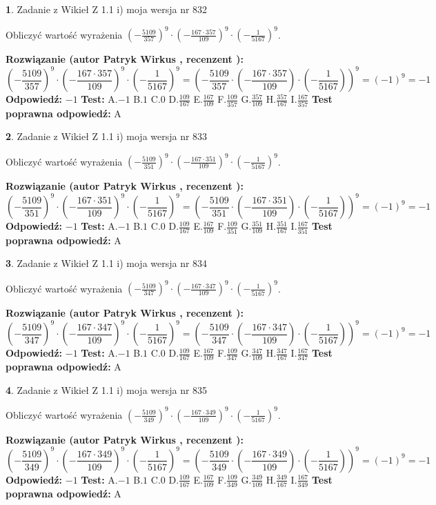 \documentclass[12pt, a4paper]{article}
\theoremstyle{definition} %
\newtheorem{zad}{}
\newcommand{\zadStart}[1]{\begin{zad}#1\newline}
\newcommand{\zadStop}{\end{zad}}
\newcommand{\rozwStart}[2]{\noindent \textbf{Rozwiązanie (autor #1 , recenzent #2): }\newline}
\newcommand{\rozwStop}{\newline}
\newcommand{\odpStart}{\noindent \textbf{Odpowiedź:}\newline}
\newcommand{\odpStop}{\newline}
\newcommand{\testStart}{\noindent \textbf{Test:}\newline}
\newcommand{\testStop}{\newline}
\newcommand{\kluczStart}{\noindent \textbf{Test poprawna odpowiedź:}\newline}
\newcommand{\kluczStop}{\newline}
\begin{document}
\zadStart{Zadanie z Wikieł Z 1.1 i) moja wersja nr 832}

Obliczyć wartość wyrażenia $(-\frac{5109}{357})^{9} \cdot (-\frac{167 \cdot 357}{109})^{9} \cdot (-\frac{1}{5167})^{9}$.
\zadStop
\rozwStart{Patryk Wirkus}{}
$$(-\frac{5109}{357})^{9} \cdot (-\frac{167 \cdot 357}{109})^{9} \cdot (-\frac{1}{5167})^{9} = (-\frac{5109}{357} \cdot (-\frac{167 \cdot 357}{109}) \cdot (-\frac{1}{5167}))^{9} = (-1)^{9} = -1$$
\rozwStop
\odpStart
$-1$
\odpStop
\testStart
A.$-1$ B.$1$ C.$0$ D.$\frac{109}{167}$ E.$\frac{167}{109}$
F.$\frac{109}{357}$ G.$\frac{357}{109}$
H.$\frac{357}{167}$
I.$\frac{167}{357}$
\testStop
\kluczStart
A
\kluczStop



\zadStart{Zadanie z Wikieł Z 1.1 i) moja wersja nr 833}

Obliczyć wartość wyrażenia $(-\frac{5109}{351})^{9} \cdot (-\frac{167 \cdot 351}{109})^{9} \cdot (-\frac{1}{5167})^{9}$.
\zadStop
\rozwStart{Patryk Wirkus}{}
$$(-\frac{5109}{351})^{9} \cdot (-\frac{167 \cdot 351}{109})^{9} \cdot (-\frac{1}{5167})^{9} = (-\frac{5109}{351} \cdot (-\frac{167 \cdot 351}{109}) \cdot (-\frac{1}{5167}))^{9} = (-1)^{9} = -1$$
\rozwStop
\odpStart
$-1$
\odpStop
\testStart
A.$-1$ B.$1$ C.$0$ D.$\frac{109}{167}$ E.$\frac{167}{109}$
F.$\frac{109}{351}$ G.$\frac{351}{109}$
H.$\frac{351}{167}$
I.$\frac{167}{351}$
\testStop
\kluczStart
A
\kluczStop



\zadStart{Zadanie z Wikieł Z 1.1 i) moja wersja nr 834}

Obliczyć wartość wyrażenia $(-\frac{5109}{347})^{9} \cdot (-\frac{167 \cdot 347}{109})^{9} \cdot (-\frac{1}{5167})^{9}$.
\zadStop
\rozwStart{Patryk Wirkus}{}
$$(-\frac{5109}{347})^{9} \cdot (-\frac{167 \cdot 347}{109})^{9} \cdot (-\frac{1}{5167})^{9} = (-\frac{5109}{347} \cdot (-\frac{167 \cdot 347}{109}) \cdot (-\frac{1}{5167}))^{9} = (-1)^{9} = -1$$
\rozwStop
\odpStart
$-1$
\odpStop
\testStart
A.$-1$ B.$1$ C.$0$ D.$\frac{109}{167}$ E.$\frac{167}{109}$
F.$\frac{109}{347}$ G.$\frac{347}{109}$
H.$\frac{347}{167}$
I.$\frac{167}{347}$
\testStop
\kluczStart
A
\kluczStop



\zadStart{Zadanie z Wikieł Z 1.1 i) moja wersja nr 835}

Obliczyć wartość wyrażenia $(-\frac{5109}{349})^{9} \cdot (-\frac{167 \cdot 349}{109})^{9} \cdot (-\frac{1}{5167})^{9}$.
\zadStop
\rozwStart{Patryk Wirkus}{}
$$(-\frac{5109}{349})^{9} \cdot (-\frac{167 \cdot 349}{109})^{9} \cdot (-\frac{1}{5167})^{9} = (-\frac{5109}{349} \cdot (-\frac{167 \cdot 349}{109}) \cdot (-\frac{1}{5167}))^{9} = (-1)^{9} = -1$$
\rozwStop
\odpStart
$-1$
\odpStop
\testStart
A.$-1$ B.$1$ C.$0$ D.$\frac{109}{167}$ E.$\frac{167}{109}$
F.$\frac{109}{349}$ G.$\frac{349}{109}$
H.$\frac{349}{167}$
I.$\frac{167}{349}$
\testStop
\kluczStart
A
\kluczStop
\end{document}
